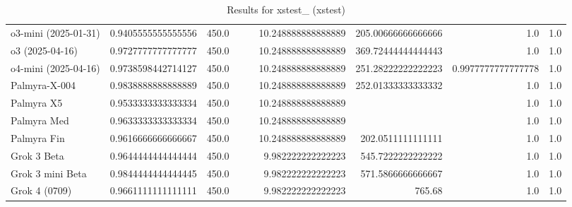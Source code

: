 \begin{table}[htp]
{\begin{tabular}{lrrrrrrrr}
o3-mini (2025-01-31) & 0.9405555555555556 & 450.0 &  &  & 10.248888888888889 & 205.00666666666666 & 1.0 & 1.0 \\
o3 (2025-04-16) & 0.9727777777777777 & 450.0 &  &  & 10.248888888888889 & 369.72444444444443 & 1.0 & 1.0 \\
o4-mini (2025-04-16) & 0.9738598442714127 & 450.0 &  &  & 10.248888888888889 & 251.28222222222223 & 0.9977777777777778 & 1.0 \\
Palmyra-X-004 & 0.9838888888888889 & 450.0 &  &  & 10.248888888888889 & 252.01333333333332 & 1.0 & 1.0 \\
Palmyra X5 & 0.9533333333333334 & 450.0 &  &  & 10.248888888888889 &  & 1.0 & 1.0 \\
Palmyra Med & 0.9633333333333334 & 450.0 &  &  & 10.248888888888889 &  & 1.0 & 1.0 \\
Palmyra Fin & 0.9616666666666667 & 450.0 &  &  & 10.248888888888889 & 202.0511111111111 & 1.0 & 1.0 \\
Grok 3 Beta & 0.9644444444444444 & 450.0 &  &  & 9.982222222222223 & 545.7222222222222 & 1.0 & 1.0 \\
Grok 3 mini Beta & 0.9844444444444445 & 450.0 &  &  & 9.982222222222223 & 571.5866666666667 & 1.0 & 1.0 \\
Grok 4 (0709) & 0.9661111111111111 & 450.0 &  &  & 9.982222222222223 & 765.68 & 1.0 & 1.0 \\
\bottomrule
\end{tabular}}
\caption{Results for xstest_ (xstest)}
\label{fig:xstest_ (xstest)}
\end{table}